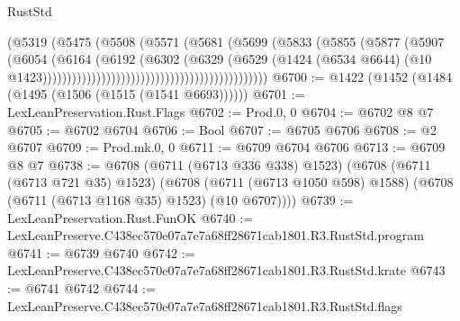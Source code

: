 \begin{lexlean}{RustStd}
\begin{coremodule}
                                                            (@5319
                                                              (@5475
                                                                (@5508
                                                                  (@5571
                                                                    (@5681
                                                                      (@5699
                                                                        (@5833
                                                                          (@5855
                                                                            (@5877
                                                                              (@5907
                                                                                (@6054
                                                                                  (@6164
                                                                                    (@6192
                                                                                      (@6302
                                                                                        (@6329
                                                                                          (@6529
                                                                                            (@1424
                                                                                              (@6534
                                                                                                @6644)
                                                                                              (@10
                                                                                                @1423))))))))))))))))))))))))))))))))))))))))))))))
@6700 := @1422 (@1452 (@1484 (@1495 (@1506 (@1515 (@1541 @6693))))))
@6701 := LexLeanPreservation.Rust.Flags
@6702 := Prod.{0, 0}
@6704 := @6702 @8 @7
@6705 := @6702 @6704
@6706 := Bool
@6707 := @6705 @6706
@6708 := @2 @6707
@6709 := Prod.mk.{0, 0}
@6711 := @6709 @6704 @6706
@6713 := @6709 @8 @7
@6738 := @6708
    (@6711 (@6713 @336 @338) @1523)
    (@6708
      (@6711 (@6713 @721 @35) @1523)
      (@6708 (@6711 (@6713 @1050 @598) @1588) (@6708 (@6711 (@6713 @1168 @35) @1523) (@10 @6707))))
@6739 := LexLeanPreservation.Rust.FunOK
@6740 := LexLeanPreserve.C438ec570e07a7e7a68ff28671cab1801.R3.RustStd.program
@6741 := @6739 @6740
@6742 := LexLeanPreserve.C438ec570e07a7e7a68ff28671cab1801.R3.RustStd.krate
@6743 := @6741 @6742
@6744 := LexLeanPreserve.C438ec570e07a7e7a68ff28671cab1801.R3.RustStd.flags

\end{coremodule}
\end{lexlean}

